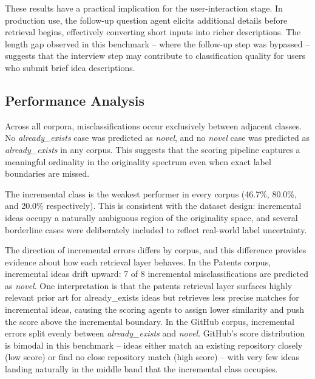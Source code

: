 These results have a practical implication for the user-interaction stage. In production use, the follow-up question agent elicits additional details before retrieval begins, effectively converting short inputs into richer descriptions. The length gap observed in this benchmark -- where the follow-up step was bypassed -- suggests that the interview step may contribute to classification quality for users who submit brief idea descriptions.
 
\subsection{Performance Analysis}
 
Across all corpora, misclassifications occur exclusively between adjacent classes. No \textit{already\_exists} case was predicted as \textit{novel}, and no \textit{novel} case was predicted as \textit{already\_exists} in any corpus. This suggests that the scoring pipeline captures a meaningful ordinality in the originality spectrum even when exact label boundaries are missed.
 
The incremental class is the weakest performer in every corpus (46.7\%, 80.0\%, and 20.0\% respectively). This is consistent with the dataset design: incremental ideas occupy a naturally ambiguous region of the originality space, and several borderline cases were deliberately included to reflect real-world label uncertainty.
 
The direction of incremental errors differs by corpus, and this difference provides evidence about how each retrieval layer behaves. In the Patents corpus, incremental ideas drift upward: 7 of 8 incremental misclassifications are predicted as \textit{novel}. One interpretation is that the patents retrieval layer surfaces highly relevant prior art for already\_exists ideas but retrieves less precise matches for incremental ideas, causing the scoring agents to assign lower similarity and push the score above the incremental boundary. In the GitHub corpus, incremental errors split evenly between \textit{already\_exists} and \textit{novel}. GitHub's score distribution is bimodal in this benchmark -- ideas either match an existing repository closely (low score) or find no close repository match (high score) -- with very few ideas landing naturally in the middle band that the incremental class occupies.
 
